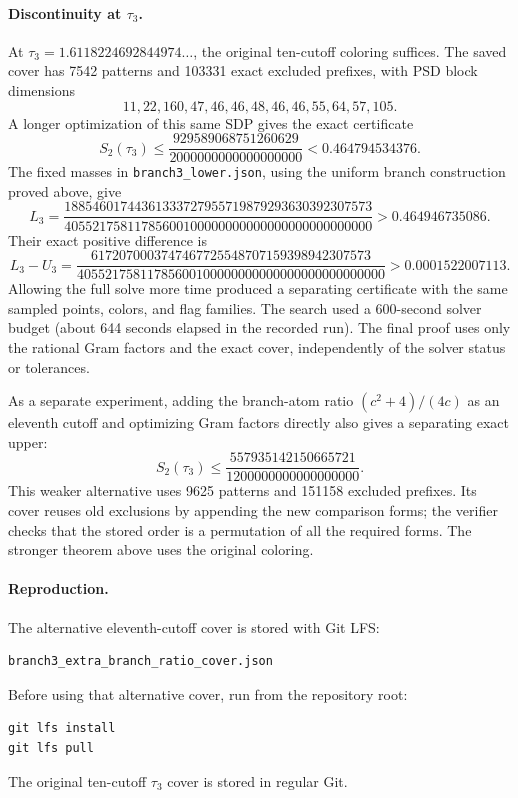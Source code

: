 \documentclass[11pt]{article}
\begin{document}
\paragraph{Discontinuity at $\tau_3$.}
At $\tau_3=1.6118224692844974\ldots$, the original ten-cutoff
coloring suffices. The saved cover has 7542 patterns and 103331 exact
excluded prefixes, with PSD block dimensions
\[
11,22,160,47,46,46,48,46,46,55,64,57,105.
\]
A longer optimization of this same SDP gives the exact certificate
\[
S_2(\tau_3)\le
\frac{929589068751260629}{2000000000000000000}
<0.464794534376.
\]
The fixed masses in \texttt{branch3\_lower.json}, using the uniform
branch construction proved above, give
\[
L_3=\frac{18854601744361333727955719879293630392307573}
{40552175811785600100000000000000000000000000}
>0.464946735086.
\]
Their exact positive difference is
\[
L_3-U_3=
\frac{6172070003747467725548707159398942307573}
{40552175811785600100000000000000000000000000}
>0.0001522007113.
\]
Allowing the full solve more time produced a separating certificate
with the same sampled points, colors, and flag families.
The search used a 600-second solver budget (about 644 seconds elapsed in
the recorded run). The final proof uses only the rational Gram factors
and the exact cover, independently of the solver status or tolerances.

As a separate experiment, adding the branch-atom ratio
$(c^2+4)/(4c)$ as an eleventh cutoff and optimizing Gram factors directly
also gives a separating exact upper:
\[
S_2(\tau_3)\le\frac{557935142150665721}{1200000000000000000}.
\]
This weaker alternative uses 9625 patterns and 151158 excluded prefixes.
Its cover reuses old exclusions by appending the new comparison forms;
the verifier checks that the stored order is a permutation of all the
required forms. The stronger theorem above uses the original coloring.

\paragraph{Reproduction.}
The alternative eleventh-cutoff cover is stored with Git LFS:
\begin{verbatim}
branch3_extra_branch_ratio_cover.json
\end{verbatim}
Before using that alternative cover, run from the repository root:
\begin{verbatim}
git lfs install
git lfs pull
\end{verbatim}
The original ten-cutoff $\tau_3$ cover is stored in regular Git.
\end{document}
